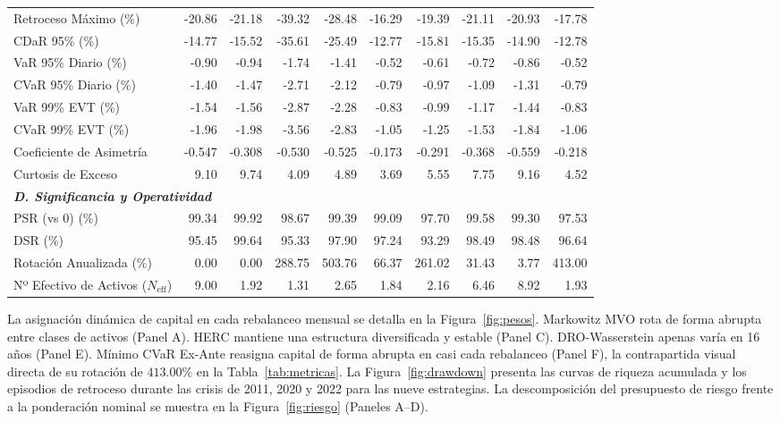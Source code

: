 \documentclass[11pt,a4paper]{article}
\begin{document}
\begin{table}[H]
{\begin{tabular}{lrrrrrrrrr}
Retroceso Máximo (\%) & -20.86 & -21.18 & -39.32 & -28.48 & -16.29 & -19.39 & -21.11 & -20.93 & -17.78 \\
CDaR 95\% (\%) & -14.77 & -15.52 & -35.61 & -25.49 & -12.77 & -15.81 & -15.35 & -14.90 & -12.78 \\
VaR 95\% Diario (\%) & -0.90 & -0.94 & -1.74 & -1.41 & -0.52 & -0.61 & -0.72 & -0.86 & -0.52 \\
CVaR 95\% Diario (\%) & -1.40 & -1.47 & -2.71 & -2.12 & -0.79 & -0.97 & -1.09 & -1.31 & -0.79 \\
VaR 99\% EVT (\%) & -1.54 & -1.56 & -2.87 & -2.28 & -0.83 & -0.99 & -1.17 & -1.44 & -0.83 \\
CVaR 99\% EVT (\%) & -1.96 & -1.98 & -3.56 & -2.83 & -1.05 & -1.25 & -1.53 & -1.84 & -1.06 \\
Coeficiente de Asimetría & -0.547 & -0.308 & -0.530 & -0.525 & -0.173 & -0.291 & -0.368 & -0.559 & -0.218 \\
Curtosis de Exceso & 9.10 & 9.74 & 4.09 & 4.89 & 3.69 & 5.55 & 7.75 & 9.16 & 4.52 \\
\midrule
\multicolumn{10}{l}{\textit{\textbf{D. Significancia y Operatividad}}} \\
PSR (vs 0) (\%) & 99.34 & 99.92 & 98.67 & 99.39 & 99.09 & 97.70 & 99.58 & 99.30 & 97.53 \\
DSR (\%) & 95.45 & 99.64 & 95.33 & 97.90 & 97.24 & 93.29 & 98.49 & 98.48 & 96.64 \\
Rotación Anualizada (\%) & 0.00 & 0.00 & 288.75 & 503.76 & 66.37 & 261.02 & 31.43 & 3.77 & 413.00 \\
Nº Efectivo de Activos ($N_{\text{eff}}$) & 9.00 & 1.92 & 1.31 & 2.65 & 1.84 & 2.16 & 6.46 & 8.92 & 1.93 \\
\bottomrule
\end{tabular}%
}
\end{table}

La asignación dinámica de capital en cada rebalanceo mensual se detalla en la Figura~\ref{fig:pesos}. Markowitz MVO rota de forma abrupta entre clases de activos (Panel A). HERC mantiene una estructura diversificada y estable (Panel C). DRO-Wasserstein apenas varía en 16 años (Panel E). Mínimo CVaR Ex-Ante reasigna capital de forma abrupta en casi cada rebalanceo (Panel F), la contrapartida visual directa de su rotación de $413.00\%$ en la Tabla~\ref{tab:metricas}. La Figura~\ref{fig:drawdown} presenta las curvas de riqueza acumulada y los episodios de retroceso durante las crisis de 2011, 2020 y 2022 para las nueve estrategias. La descomposición del presupuesto de riesgo frente a la ponderación nominal se muestra en la Figura~\ref{fig:riesgo} (Paneles A--D).
\end{document}
